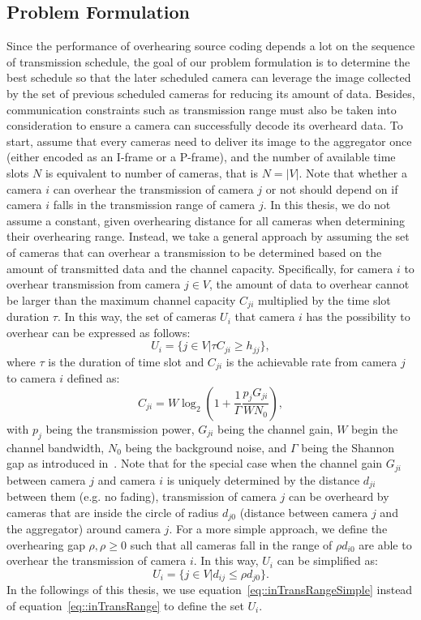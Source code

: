 \subsection{Problem Formulation}
Since the performance of overhearing source coding depends a lot on the sequence of transmission schedule, the goal of our problem formulation is to determine the best schedule so that the later scheduled camera can leverage the image collected by the set of previous scheduled cameras for reducing its amount of data.
Besides, communication constraints such as transmission range must also be taken into consideration to ensure a camera can successfully decode its overheard data.
%
To start, assume that every cameras need to deliver its image to the aggregator once (either encoded as an I-frame or a P-frame), and the number of available time slots $N$ is equivalent to number of cameras, that is ${N=|V|}$.
Note that whether a camera $i$ can overhear the transmission of camera $j$ or not should depend on if camera $i$ falls in the transmission range of camera $j$.
In this thesis, we do not assume a constant, given overhearing distance for all cameras when determining their overhearing range.
Instead, we take a general approach by assuming the set of cameras that can overhear a transmission to be determined based on the amount of transmitted data and the channel capacity.
Specifically, for camera $i$ to overhear transmission from camera $j \in V$, the amount of data to overhear cannot be larger than the maximum channel capacity $C_{ji}$ multiplied by the time slot duration $\tau$.
In this way, the set of cameras $U_i$ that camera $i$ has the possibility to overhear can be expressed as follows:
\begin{equation}
U_i = \{ j \in V | \tau C_{ji} \geq h_{jj} \},
\label{eq::inTransRange}
\end{equation}
where $\tau$ is the duration of time slot and $C_{ji}$ is the achievable rate from camera $j$ to camera $i$ defined as:
\begin{equation}
C_{ji} = W \log_2 \left( 1+\frac{1}{\Gamma} \frac{p_j G_{ji}}{WN_0} \right),
\label{eq::capacity}
\end{equation}
with $p_j$ being the transmission power, $G_{ji}$ being the channel gain, $W$ begin the channel bandwidth, $N_0$ being the background noise, and $\Gamma$ being the Shannon gap as introduced in~\cite{MQAM}.
Note that for the special case when the channel gain $G_{ji}$ between camera $j$ and camera $i$ is uniquely determined by the distance $d_{ji}$ between them (e.g. no fading), transmission of camera $j$ can be overheard by cameras that are inside the circle of radius $d_{j0}$ (distance between camera $j$ and the aggregator) around camera $j$.
For a more simple approach, we define the overhearing gap ${\rho, \rho \geq 0}$ such that all cameras fall in the range of $\rho d_{i0}$ are able to overhear the transmission of camera $i$.
In this way, $U_i$ can be simplified as:
\begin{equation}
U_i = \{ j \in V | d_{ij} \leq \rho d_{j0} \}.
\label{eq::inTransRangeSimple}
\end{equation}
In the followings of this thesis, we use equation~\eqref{eq::inTransRangeSimple} instead of equation~\eqref{eq::inTransRange} to define the set $U_i$.

